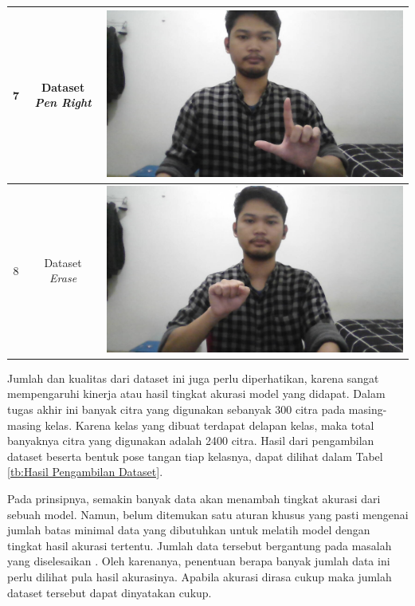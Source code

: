 \begin{longtable}{|c|c|c|}
  \hline
  7 & Dataset \emph{Pen Right}  &  \includegraphics[scale=0.2]{gambar/pengambilan-dataset/dataset-pen-right.jpg} \\
  \hline
  8 & Dataset \emph{Erase}  &  \includegraphics[scale=0.2]{gambar/pengambilan-dataset/dataset-erase.jpg} \\
  \hline
\end{longtable}

Jumlah dan kualitas dari dataset ini juga perlu diperhatikan, karena sangat mempengaruhi kinerja atau hasil tingkat akurasi model yang didapat. Dalam tugas akhir ini banyak citra yang digunakan sebanyak 300 citra pada masing-masing kelas. Karena kelas yang dibuat terdapat delapan kelas, maka total banyaknya citra yang digunakan adalah 2400 citra. Hasil dari pengambilan dataset beserta bentuk pose tangan tiap kelasnya, dapat dilihat dalam Tabel \ref{tb:Hasil Pengambilan Dataset}.

Pada prinsipnya, semakin banyak data akan menambah tingkat akurasi dari sebuah model. Namun, belum ditemukan satu aturan khusus yang pasti mengenai jumlah batas minimal data yang dibutuhkan untuk melatih model dengan tingkat hasil akurasi tertentu. Jumlah data tersebut bergantung pada masalah yang diselesaikan \parencite{Junghwan}. Oleh karenanya, penentuan berapa banyak jumlah data ini perlu dilihat pula hasil akurasinya. Apabila akurasi dirasa cukup maka jumlah dataset tersebut dapat dinyatakan cukup.

